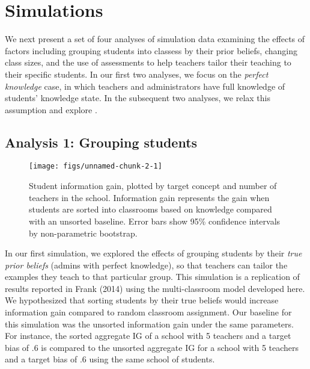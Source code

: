 \documentclass[10pt, letterpaper]{article}
\newenvironment{CodeChunk}{}{}
\begin{document}
\section{Simulations}\label{simulations}

We next present a set of four analyses of simulation data examining the
effects of factors including grouping students into classess by their
prior beliefs, changing class sizes, and the use of assessments to help
teachers tailor their teaching to their specific students. In our first
two analyses, we focus on the \emph{perfect knowledge} case, in which
teachers and administrators have full knowledge of students' knowledge
state. In the subsequent two analyses, we relax this assumption and
explore .

\subsection{Analysis 1: Grouping
students}\label{analysis-1-grouping-students}

\begin{CodeChunk}
\begin{figure}[t]
\texttt{[image: figs/unnamed-chunk-2-1]} \caption[Student information gain, plotted by target concept and number of teachers in the school]{Student information gain, plotted by target concept and number of teachers in the school. Information gain represents the gain when students are sorted into classrooms based on knowledge compared with an unsorted baseline. Error bars show 95\% confidence intervals by non-parametric bootstrap.}\label{fig:unnamed-chunk-2}
\end{figure}
\end{CodeChunk}

In our first simulation, we explored the effects of grouping students by
their \emph{true prior beliefs} (admins with perfect knowledge), so that
teachers can tailor the examples they teach to that particular group.
This simulation is a replication of results reported in Frank (2014)
using the multi-classroom model developed here. We hypothesized that
sorting students by their true beliefs would increase information gain
compared to random classroom assignment. Our baseline for this
simulation was the unsorted information gain under the same parameters.
For instance, the sorted aggregate IG of a school with 5 teachers and a
target bias of .6 is compared to the unsorted aggregate IG for a school
with 5 teachers and a target bias of .6 using the same school of
students.
\end{document}
